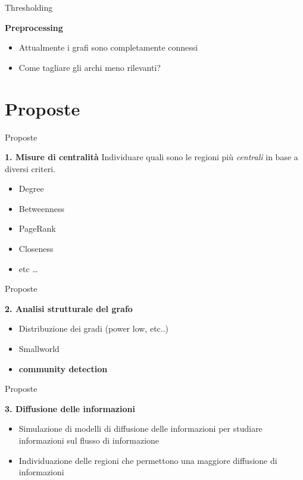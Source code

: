 \documentclass[10pt, compress]{beamer}
\begin{document}
		
		\begin{frame}{Thresholding}
			\begin{block}{\textbf{Preprocessing}}
				\begin{itemize}
					\item Attualmente i grafi sono completamente connessi
					\item Come tagliare gli archi meno rilevanti?
				\end{itemize}
			\end{block}
		\end{frame}
		
		\section{Proposte}
			\begin{frame}{Proposte}
				\begin{block}{\textbf{1. Misure di centralità}}
					Individuare quali sono le regioni più \emph{centrali} in base a diversi criteri. \newline
					\begin{itemize}
						\item Degree
						\item Betweenness
						\item PageRank
						\item Closeness
						\item etc \dots
					\end{itemize}
				\end{block}
			\end{frame}
			
			\begin{frame}{Proposte}
				\begin{block}{\textbf{2. Analisi strutturale del grafo}}
					\begin{itemize}
						\item Distribuzione dei gradi (power low, etc..)
						\item Smallworld
						\item \textbf{community detection}
					\end{itemize}
				\end{block}
			\end{frame}
			
			\begin{frame}{Proposte}
				\begin{block}{\textbf{3. Diffusione delle informazioni}}
					\begin{itemize}
						\item Simulazione di modelli di diffusione delle informazioni per studiare informazioni sul flusso di informazione
						\item Individuazione delle regioni  che permettono una maggiore diffusione di informazioni
					\end{itemize}
				\end{block}
			\end{frame}
			
			
\end{document}
